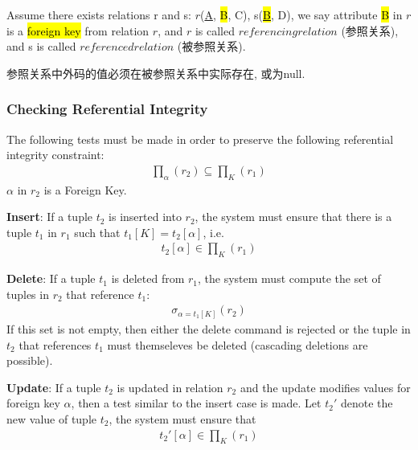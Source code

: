 Assume there exists relations r and s: $r$(\underline{A}, \hl{B}, C), s(\hl{\underline{B}}, D), we say attribute \hl{B} in $r$ is a \hl{foreign key} from relation $r$, and $r$ is called $referencing relation$ (参照关系), and s is called $referenced relation$ (被参照关系).

参照关系中外码的值必须在被参照关系中实际存在, 或为null.

\subsubsection{Checking Referential Integrity}
The following tests must be made in order to preserve the following referential integrity constraint: 
\begin{align*}
    \prod_{\alpha}(r_2) \subseteq \prod_K (r_1)
\end{align*}
$\alpha$ in $r_2$ is a Foreign Key. 

\textbf{Insert}: If a tuple $t_2$ is inserted into $r_2$, the system must ensure that there is a tuple $t_1$ in $r_1$ such that $t_1[K]=t_2[\alpha]$, i.e.
\begin{align*}
    t_2[\alpha]\in \prod_K (r_1)
\end{align*}

\textbf{Delete}: If a tuple $t_1$ is deleted from $r_1$, the system must compute the set of tuples in $r_2$ that reference $t_1$:
\begin{align*}
    \sigma_{\alpha=t_1[K]}(r_2)
\end{align*}
If this set is not empty, then either the delete command is rejected or the tuple in $t_2$ that references $t_1$ must themseleves be deleted (cascading deletions are possible).  

\textbf{Update}: If a tuple $t_2$ is updated in relation $r_2$ and the update modifies values for foreign key $\alpha$, then a test similar to the insert case is made. Let $t_2'$ denote the new value of tuple $t_2$, the system must ensure that 
\begin{align*}
    t_2'[\alpha]\in \prod_K(r_1)
\end{align*}

